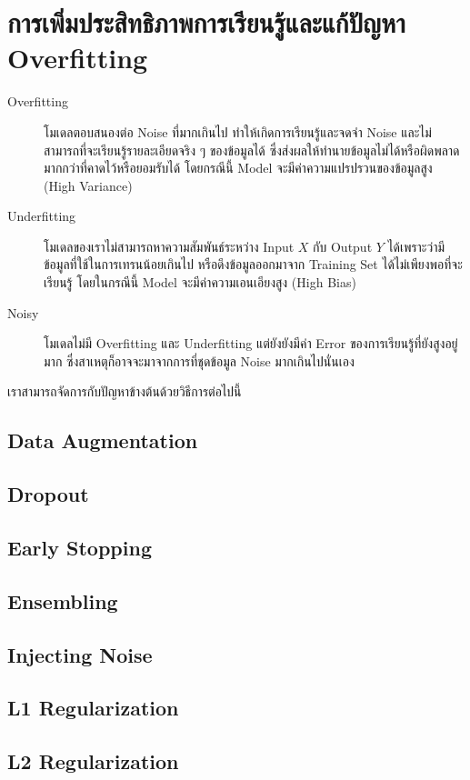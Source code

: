 \section{การเพิ่มประสิทธิภาพการเรียนรู้และแก้ปัญหา Overfitting}

\begin{description} 
    \item[Overfitting] โมเดลตอบสนองต่อ Noise ที่มากเกินไป ทำให้เกิดการเรียนรู้และจดจำ Noise และไม่สามารถที่จะเรียนรู้รายละเอียดจริง ๆ ของข้อมูลได้
    ซึ่งส่งผลให้ทำนายข้อมูลไม่ได้หรือผิดพลาดมากกว่าที่คาดไว้หรือยอมรับได้ โดยกรณีนี้ Model จะมีค่าความแปรปรวนของข้อมูลสูง (High Variance)
    
    \item[Underfitting] โมเดลของเราไม่สามารถหาความสัมพันธ์ระหว่าง Input $X$ กับ Output $Y$ ได้เพราะว่ามีข้อมูลที่ใช้ในการเทรนน้อยเกินไป
    หรือดึงข้อมูลออกมาจาก Training Set ได้ไม่เพียงพอที่จะเรียนรู้ โดยในกรณีนี้ Model จะมีค่าความเอนเอียงสูง (High Bias)

    \item[Noisy] โมเดลไม่มี Overfitting และ Underfitting แต่ยังยังมีค่า Error ของการเรียนรู้ที่ยังสูงอยู่มาก ซึ่งสาเหตุก็อาจจะมาจากการที่ชุดข้อมูล Noise มากเกินไปนั่นเอง
\end{description}

เราสามารถจัดการกับปัญหาข้างต้นด้วยวิธีการต่อไปนี้

\subsection{Data Augmentation}

\subsection{Dropout}

\subsection{Early Stopping}

\subsection{Ensembling}

\subsection{Injecting Noise}

\subsection{L1 Regularization}

\subsection{L2 Regularization}
